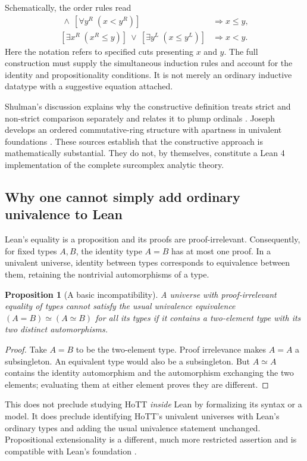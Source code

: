 \documentclass[11pt,letterpaper]{article}
\numberwithin{equation}{section}
\newtheorem{proposition}[theorem]{Proposition}
\theoremstyle{definition}
\theoremstyle{remark}
\begin{document}
Schematically, the order rules read
\begin{align*}
 [\forall x^L\;(x^L<y)]\ \land\ [\forall y^R\;(x<y^R)]&\Longrightarrow x\le y,\\
 [\exists x^R\;(x^R\le y)]\ \lor\ [\exists y^L\;(x\le y^L)]&\Longrightarrow x<y.
\end{align*}
Here the notation refers to specified cuts presenting $x$ and $y$. The full construction must supply the simultaneous induction rules and account for the identity and propositionality conditions. It is not merely an ordinary inductive datatype with a suggestive equation attached.

Shulman's discussion explains why the constructive definition treats strict and non-strict comparison separately and relates it to plump ordinals \cite{Shulman}. Joseph develops an ordered commutative-ring structure with apartness in univalent foundations \cite{Joseph}. These sources establish that the constructive approach is mathematically substantial. They do not, by themselves, constitute a Lean 4 implementation of the complete surcomplex analytic theory.

\subsection{Why one cannot simply add ordinary univalence to Lean}
Lean's equality is a proposition and its proofs are proof-irrelevant. Consequently, for fixed types $A,B$, the identity type $A=B$ has at most one proof. In a univalent universe, identity between types corresponds to equivalence between them, retaining the nontrivial automorphisms of a type.

\begin{proposition}[A basic incompatibility]\label{prop:univalence}
A universe with proof-irrelevant equality of types cannot satisfy the usual univalence equivalence $(A=B)\simeq(A\simeq B)$ for all its types if it contains a two-element type with its two distinct automorphisms.
\end{proposition}
\begin{proof}
Take $A=B$ to be the two-element type. Proof irrelevance makes $A=A$ a subsingleton. An equivalent type would also be a subsingleton. But $A\simeq A$ contains the identity automorphism and the automorphism exchanging the two elements; evaluating them at either element proves they are different.
\end{proof}

This does not preclude studying HoTT \emph{inside} Lean by formalizing its syntax or a model. It does preclude identifying HoTT's univalent universes with Lean's ordinary types and adding the usual univalence statement unchanged. Propositional extensionality is a different, much more restricted assertion and is compatible with Lean's foundation \cite{LeanAxioms}.
\end{document}
